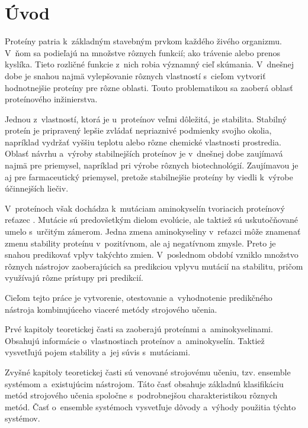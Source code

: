 
\chapter{Úvod}

Proteíny patria k~základným stavebným prvkom každého živého organizmu. V~ňom sa podieľajú na množstve rôznych funkcií; ako trávenie alebo prenos kyslíka. Tieto rozličné funkcie z~nich robia významný cieľ skúmania. V~dnešnej dobe je snahou najmä vylepšovanie rôznych vlastností s~cieľom vytvoriť hodnotnejšie proteíny pre rôzne oblasti. Touto problematikou sa zaoberá oblasť proteínového inžinierstva.

Jednou z~vlastností, ktorá je u~proteínov veľmi dôležitá, je stabilita. Stabilný proteín je pripravený lepšie zvládať nepriaznivé podmienky svojho okolia, napríklad vydržať vyššiu teplotu alebo rôzne chemické vlastnosti prostredia. Oblasť návrhu a~výroby stabilnejších proteínov je v~dnešnej dobe zaujímavá najmä pre priemysel, napríklad pri výrobe rôznych biotechnológií. Zaujímavou je aj pre farmaceutický priemysel, pretože stabilnejšie proteíny by viedli k~výrobe účinnejších liečiv.

V~proteínoch však dochádza k~mutáciam aminokyselín tvoriacich proteínový reťazec . Mutácie sú predovšetkým dielom evolúcie, ale taktiež sú uskutočňované umelo s~určitým zámerom. Jedna zmena aminokyseliny v~reťazci môže znamenať zmenu stability proteínu v~pozitívnom, ale aj negatívnom zmysle. Preto je snahou predikovať vplyv takýchto zmien. 
V~poslednom období vzniklo množstvo rôznych nástrojov zaoberajúcich sa predikciou vplyvu mutácií na stabilitu, pričom využívajú rôzne prístupy pri predikcií.

Cieľom tejto práce je vytvorenie, otestovanie a~vyhodnotenie predikčného nástroja kombinujúceho viaceré metódy strojového učenia.

Prvé kapitoly teoretickej časti sa zaoberajú proteínmi a~aminokyselinami. Obsahujú informácie o~vlastnostiach proteínov a~aminokyselín. Taktiež vysvetľujú pojem stability a~jej súvis s~mutáciami.

Zvyšné kapitoly teoretickej časti sú venované strojovému učeniu, tzv. ensemble systémom a~existujúcim nástrojom. Táto časť obsahuje základnú klasifikáciu metód strojového učenia spoločne s~podrobnejšou charakteristikou rôznych metód. Časť o~ensemble systémoch vysvetľuje dôvody a~výhody použitia týchto systémov.

